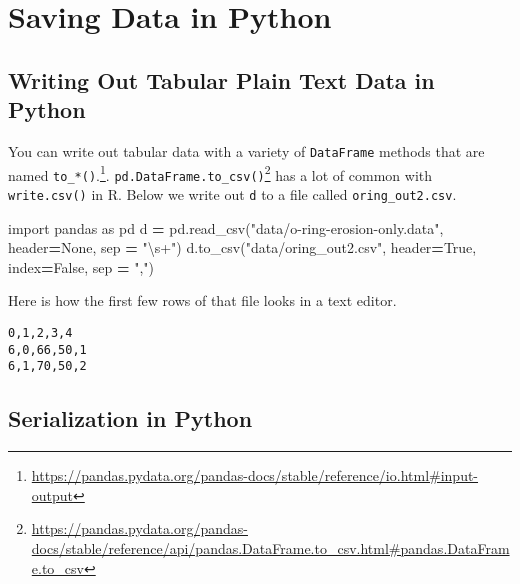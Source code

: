 \documentclass[
  12pt,
  krantz2]{krantz}
\makeatletter
\newenvironment{Shaded}{\begin{snugshade}}{\end{snugshade}}
\newcommand{\ImportTok}[1]{#1}
\newcommand{\NormalTok}[1]{#1}
\newcommand{\OperatorTok}[1]{\textcolor[rgb]{0.43,0.43,0.43}{\textbf{#1}}}
\newcommand{\StringTok}[1]{\textcolor[rgb]{0.5,0.5,0.5}{#1}}
\newcommand{\VariableTok}[1]{\textcolor[rgb]{0,0,0}{#1}}
\renewcommand{\href}[2]{#2\footnote{\url{#1}}}
\newenvironment{kframe}{%
\medskip{}
\setlength{\fboxsep}{.8em}
 \def\at@end@of@kframe{}%
 \ifinner\ifhmode%
  \def\at@end@of@kframe{\end{minipage}}%
  \begin{minipage}{\columnwidth}%
 \fi\fi%
 \def\FrameCommand##1{\hskip\@totalleftmargin \hskip-\fboxsep
 \colorbox{shadecolor}{##1}\hskip-\fboxsep
     \hskip-\linewidth \hskip-\@totalleftmargin \hskip\columnwidth}%
 \MakeFramed {\advance\hsize-\width
   \@totalleftmargin\z@ \linewidth\hsize
   \@setminipage}}%
 {\par\unskip\endMakeFramed%
 \at@end@of@kframe}
\renewenvironment{Shaded}{\begin{kframe}}{\end{kframe}}
\makeatother
\begin{document}
\hypertarget{saving-data-in-python}{%
\section{Saving Data in Python}\label{saving-data-in-python}}

\hypertarget{writing-out-tabular-plain-text-data-in-python}{%
\subsection{Writing Out Tabular Plain Text Data in Python}\label{writing-out-tabular-plain-text-data-in-python}}

You can write out tabular data with a variety of \href{https://pandas.pydata.org/pandas-docs/stable/reference/io.html\#input-output}{\texttt{DataFrame} methods that are named \texttt{to\_*()}.}. \href{https://pandas.pydata.org/pandas-docs/stable/reference/api/pandas.DataFrame.to_csv.html\#pandas.DataFrame.to_csv}{\texttt{pd.DataFrame.to\_csv()}} has a lot of common with \texttt{write.csv()} in R. Below we write out \texttt{d} to a file called \texttt{oring\_out2.csv}.

\begin{Shaded}
\begin{Highlighting}[]
\ImportTok{import}\NormalTok{ pandas }\ImportTok{as}\NormalTok{ pd}
\NormalTok{d }\OperatorTok{=}\NormalTok{ pd.read\_csv(}\StringTok{"data/o{-}ring{-}erosion{-}only.data"}\NormalTok{, }
\NormalTok{                  header}\OperatorTok{=}\VariableTok{None}\NormalTok{, sep }\OperatorTok{=} \StringTok{"\textbackslash{}s+"}\NormalTok{)}
\NormalTok{d.to\_csv(}\StringTok{"data/oring\_out2.csv"}\NormalTok{, }
\NormalTok{          header}\OperatorTok{=}\VariableTok{True}\NormalTok{, index}\OperatorTok{=}\VariableTok{False}\NormalTok{, sep }\OperatorTok{=} \StringTok{","}\NormalTok{)}
\end{Highlighting}
\end{Shaded}

Here is how the first few rows of that file looks in a text editor.

\begin{verbatim}
0,1,2,3,4
6,0,66,50,1
6,1,70,50,2
\end{verbatim}

\hypertarget{serialization-in-python}{%
\subsection{Serialization in Python}\label{serialization-in-python}}
\end{document}
